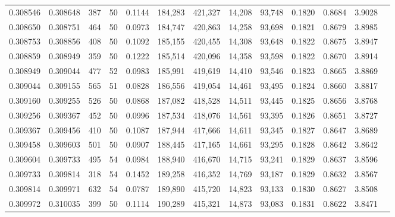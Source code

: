 \begin{tabular}{rrrrrrrrrrrrr}
0.308546 & 0.308648 &   387 &  50 &                                     0.1144 & 184,283 & 421,327 &  14,208 &  93,748 & 0.1820 & 0.8684 & 3.9028 \\
0.308650 & 0.308751 &   464 &  50 &                                     0.0973 & 184,747 & 420,863 &  14,258 &  93,698 & 0.1821 & 0.8679 & 3.8985 \\
0.308753 & 0.308856 &   408 &  50 &                                     0.1092 & 185,155 & 420,455 &  14,308 &  93,648 & 0.1822 & 0.8675 & 3.8947 \\
0.308859 & 0.308949 &   359 &  50 &                                     0.1222 & 185,514 & 420,096 &  14,358 &  93,598 & 0.1822 & 0.8670 & 3.8914 \\
0.308949 & 0.309044 &   477 &  52 &                                     0.0983 & 185,991 & 419,619 &  14,410 &  93,546 & 0.1823 & 0.8665 & 3.8869 \\
0.309044 & 0.309155 &   565 &  51 &                                     0.0828 & 186,556 & 419,054 &  14,461 &  93,495 & 0.1824 & 0.8660 & 3.8817 \\
0.309160 & 0.309255 &   526 &  50 &                                     0.0868 & 187,082 & 418,528 &  14,511 &  93,445 & 0.1825 & 0.8656 & 3.8768 \\
0.309256 & 0.309367 &   452 &  50 &                                     0.0996 & 187,534 & 418,076 &  14,561 &  93,395 & 0.1826 & 0.8651 & 3.8727 \\
0.309367 & 0.309456 &   410 &  50 &                                     0.1087 & 187,944 & 417,666 &  14,611 &  93,345 & 0.1827 & 0.8647 & 3.8689 \\
0.309458 & 0.309603 &   501 &  50 &                                     0.0907 & 188,445 & 417,165 &  14,661 &  93,295 & 0.1828 & 0.8642 & 3.8642 \\
0.309604 & 0.309733 &   495 &  54 &                                     0.0984 & 188,940 & 416,670 &  14,715 &  93,241 & 0.1829 & 0.8637 & 3.8596 \\
0.309733 & 0.309814 &   318 &  54 &                                     0.1452 & 189,258 & 416,352 &  14,769 &  93,187 & 0.1829 & 0.8632 & 3.8567 \\
0.309814 & 0.309971 &   632 &  54 &                                     0.0787 & 189,890 & 415,720 &  14,823 &  93,133 & 0.1830 & 0.8627 & 3.8508 \\
0.309972 & 0.310035 &   399 &  50 &                                     0.1114 & 190,289 & 415,321 &  14,873 &  93,083 & 0.1831 & 0.8622 & 3.8471 \\

\end{tabular}
